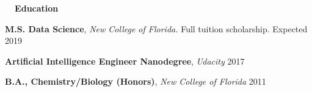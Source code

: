 \documentclass[a4paper,12pt]{article}
\newcommand{\resheading}[1]{{\vspace*{.001in} \colorbox{mygrey}{\begin{minipage}{\textwidth}{\textmd{\large \textbf{#1} \vphantom{p\^{E}}}}\end{minipage}}} }
\newcommand{\ressubheading}[4]{
        \textbf{#1} \hfill #2\\
        \textit{#3} \hfill #4 \\}
\begin{document}




\resheading{~~Education}

\textbf{M.S. Data Science}, \textit{New College of Florida.} Full tuition scholarship. \hfill Expected 2019

\textbf{Artificial Intelligence Engineer Nanodegree}, \textit{Udacity} \hfill 2017

\textbf{B.A., Chemistry/Biology (Honors)}, \textit{New College of Florida} \hfill 2011

\end{document}
